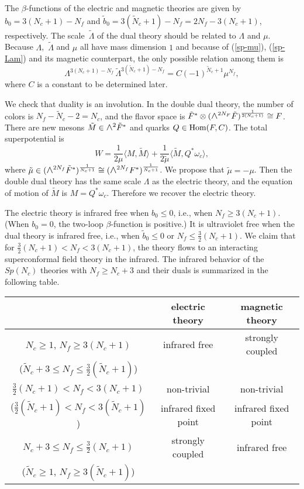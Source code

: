 \documentclass[lecture]{qft-l}
\newcommand{\om}{\omega}
\newcommand{\Lam}{\varLambda}
\newcommand{\medwedge}{\mbox{\fontsize{12pt}{0pt}\selectfont $\wedge$}}
\newcommand{\Hom}{{\rm Hom}}
\newcommand{\bra}{\langle}
\newcommand{\ket}{\rangle}
\newcommand{\inv}[1]{\frac{1}{#1}}
\newcommand{\tLam}{\,\tilde{\!\Lam}{}}
\newcommand{\tF}{\tilde{F}{}}
\newcommand{\tM}{\tilde{M}{}}
\newcommand{\tN}{\tilde{N}_c}
\begin{document}
The $\beta$-functions of the electric and magnetic theories are given by
$b_0=3(N_c+1)-N_f$ and $\tilde{b}_0=3(\tN+1)-N_f=2N_f-3(N_c+1)$, respectively.
The scale $\tLam$ of the dual theory should be related to $\Lam$ and $\mu$.
Because $\Lam$, $\tLam$ and $\mu$ all have mass dimension $1$ and
because of (\ref{sp-mu}), (\ref{sp-Lam}) and its magnetic counterpart,
the only possible relation among them is
	\begin{equation}\label{sp-scaleD}
\Lam^{3(N_c+1)-N_f}\tLam^{3(\tN+1)-N_f}=C(-1)^{\tN+1}\mu^{N_f},
	\end{equation}
where $C$ is a constant to be determined later.

We check that duality is an involution.
In the double dual theory, the number of colors is $N_f-\tN-2=N_c$, and the
flavor space is $\tF^*\otimes(\medwedge^{2N_F}\tF)^{\inv{2(N_c+1)}}\cong F$.
There are new mesons $\tM\in\medwedge^2\tF^*$ and quarks $Q\in\Hom(F,C)$.
The total superpotential is
	\begin{equation}\label{sp-WDD}
W=\inv{2\mu}\bra M,\tM\ket+\inv{2\tilde{\mu}}\bra\tM,Q^*\om_c\ket,
	\end{equation}
where $\tilde{\mu}\in(\medwedge^{2N_f}\tF^*)^{\inv{N_c+1}}\cong
(\medwedge^{2N_f}F^*)^{\inv{\tN+1}}$.
We propose that $\tilde{\mu}=-\mu$.
Then the double dual theory has the same scale $\Lam$ as the electric theory,
and the equation of motion of $\tM$ is $M=Q^*\om_c$.
Therefore we recover the electric theory.

The electric theory is infrared free when $b_0\le0$, i.e., 
when $N_f\ge3(N_c+1)$.
(When $b_0=0$, the two-loop $\beta$-function is positive.)
It is ultraviolet free when the dual theory is infrared free, i.e.,
when $\tilde{b}_0\le0$ or $N_f\le\frac{3}{2}(N_c+1)$.
We claim that for $\frac{3}{2}(N_c+1)<N_f<3(N_c+1)$, the theory flows
to an interacting superconformal field theory in the infrared.
The infrared behavior of the $Sp(N_c)$ theories with $N_f\ge N_c+3$ 
and their duals is summarized in the following table.

\begin{center}
\renewcommand{\arraystretch}{1.3}
\begin{tabular}{c|c|c}
&   electric theory	&     magnetic theory	\\
\hline
$N_c\ge1$, $N_f\ge3(N_c+1)$ &infrared free &strongly coupled\\
($\tN+3\le N_f\le\frac{3}{2}(\tN+1)$) &  &\\
\hline	
$\frac{3}{2}(N_c+1)<N_f<3(N_c+1)$ &    non-trivial &non-trivial	\\
($\frac{3}{2}(\tN+1)<N_f<3(\tN+1)$)& 
infrared fixed point& infrared fixed point\\  
\hline
$N_c+3\le N_f\le\frac{3}{2}(N_c+1)$ & strongly coupled 
  & infrared free\\
($\tN\ge1$, $N_f\ge3(\tN+1)$) &		&
\end{tabular}
\end{center}
\medskip
\end{document}
